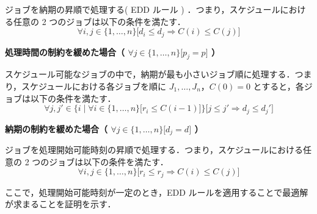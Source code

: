 \documentclass[12pt]{optlab-bachelor}
\begin{document}
  ジョブを納期の昇順で処理する( EDD ルール ) ．つまり，スケジュールにおける任意の 2 つのジョブは以下の条件を満たす．
  $$\forall i, j \in \{1,\ldots,n\}\big[d_i \le d_j \Rightarrow C(i) \le C(j)\big]$$


  \noindent\textbf{処理時間の制約を緩めた場合（ $\forall j \in \{1,\ldots,n\}\big[ p_j = p \big]$ ）}

  スケジュール可能なジョブの中で，納期が最も小さいジョブ順に処理する．つまり，スケジュールにおける各ジョブを順に $J_1,\ldots,J_n$，$C(0) = 0$ とすると，各ジョブは以下の条件を満たす．
  $$\forall j, j' \in \bigg\{i \mid \forall i \in \{1,\ldots,n\}\big[r_i \le C(i - 1)\big]\bigg\}\bigg[j \le j' \Rightarrow d_j \le d_j'\bigg]$$

  \noindent\textbf{納期の制約を緩めた場合（ $\forall j \in \{1,\ldots,n\}\big[ d_j = d \big]$ ）}

  ジョブを処理開始可能時刻の昇順で処理する．つまり，スケジュールにおける任意の 2 つのジョブは以下の条件を満たす．
  $$\forall i, j \in \{1,\ldots,n\}\big[r_i \le r_j \Rightarrow C(i) \le C(j)\big]$$

  ここで，処理開始可能時刻が一定のとき，EDD ルールを適用することで最適解
  が求まることを証明を示す．
  \\
\end{document}
